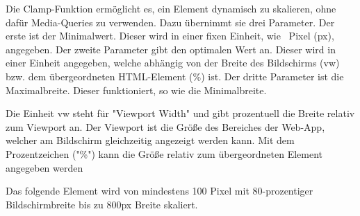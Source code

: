 \label{sec:clamp}

Die Clamp-Funktion ermöglicht es, ein Element dynamisch zu skalieren, ohne dafür Media-Queries zu verwenden. 
Dazu übernimmt sie drei Parameter. Der erste ist der Minimalwert. 
Dieser wird in einer fixen Einheit, wie \zb\ Pixel (px), angegeben. 
Der zweite Parameter gibt den optimalen Wert an. 
Dieser wird in einer Einheit angegeben, welche abhängig von der Breite des Bildschirms (vw) bzw. dem übergeordneten HTML-Element (\%) ist. 
Der dritte Parameter ist die Maximalbreite. 
Dieser funktioniert, so wie die Minimalbreite. 

Die Einheit {\ttfamily vw} steht für "Viewport Width" und gibt prozentuell die Breite relativ zum Viewport an. Der Viewport ist die Größe des Bereiches der Web-App, welcher am Bildschirm gleichzeitig angezeigt werden kann. 
Mit dem Prozentzeichen ("{\ttfamily \%}") kann die Größe relativ zum übergeordneten Element angegeben werden

Das folgende Element wird von mindestens 100 Pixel mit 80-prozentiger Bildschirmbreite bis zu 800px Breite skaliert.

